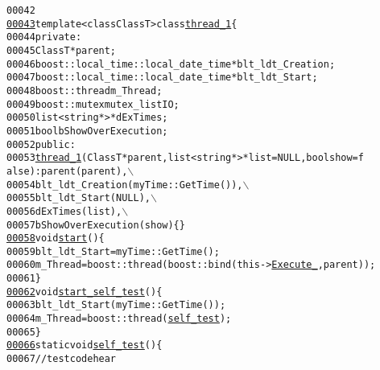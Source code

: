 \begin{footnotesize}
\begin{alltt}
00042 
\hypertarget{myThreadTemplates_8hpp_source_l00043}{}\hyperlink{classmyThreadTemplates_1_1thread__1}{00043} \textcolor{keyword}{template} <\textcolor{keyword}{class} ClassT> \textcolor{keyword}{class }\hyperlink{classmyThreadTemplates_1_1thread__1}{thread_1}\{
00044         \textcolor{keyword}{private}:
00045                 ClassT *parent; 
00046                 boost::local\_time::local\_date\_time *blt\_ldt\_Creation; 
00047                 boost::local\_time::local\_date\_time *blt\_ldt\_Start; 
00048                 boost::thread m\_Thread; 
00049                 boost::mutex mutex\_listIO; 
00050                 list<string*> *dExTimes; 
00051                 \textcolor{keywordtype}{bool} bShowOverExecution; 
00052         \textcolor{keyword}{public}:
00053                 \hyperlink{classmyThreadTemplates_1_1thread__1}{thread_1}(ClassT *parent, list<string*> *list = NULL,\textcolor{keywordtype}{bool} show = \textcolor{keyword}{f
      alse}): parent(parent),\(\backslash\)
00054                 blt\_ldt\_Creation(myTime::GetTime()),\(\backslash\)
00055                 blt\_ldt\_Start(NULL),\(\backslash\)
00056                 dExTimes(list),\(\backslash\)
00057                 bShowOverExecution(show)\{\}
\hypertarget{myThreadTemplates_8hpp_source_l00058}{}\hyperlink{classmyThreadTemplates_1_1thread__1_a40dcf528dbb18b16ed44054451a575e1}{00058}                 \textcolor{keywordtype}{void} \hyperlink{classmyThreadTemplates_1_1thread__1_a40dcf528dbb18b16ed44054451a575e1}{start}()\{
00059             blt\_ldt\_Start = myTime::GetTime();
00060             m\_Thread = boost::thread (boost::bind(this->\hyperlink{classmyThreadTemplates_1_1thread__1_a24e615ac4afa0d376faefd500ed47e43}{Execute_},parent));
00061         \}
\hypertarget{myThreadTemplates_8hpp_source_l00062}{}\hyperlink{classmyThreadTemplates_1_1thread__1_aaa171242d5355f2a472a566d30863894}{00062}                 \textcolor{keywordtype}{void} \hyperlink{classmyThreadTemplates_1_1thread__1_aaa171242d5355f2a472a566d30863894}{start_self_test}()\{
00063             blt\_ldt\_Start(myTime::GetTime());
00064             m\_Thread = boost::thread (\hyperlink{classmyThreadTemplates_1_1thread__1_add97f72749590d4023fd23fcd0a3dece}{self_test});
00065         \}
\hypertarget{myThreadTemplates_8hpp_source_l00066}{}\hyperlink{classmyThreadTemplates_1_1thread__1_add97f72749590d4023fd23fcd0a3dece}{00066}                 \textcolor{keyword}{static} \textcolor{keywordtype}{void} \hyperlink{classmyThreadTemplates_1_1thread__1_add97f72749590d4023fd23fcd0a3dece}{self_test}()\{
00067             \textcolor{comment}{//test code hear}

\end{alltt}
\end{footnotesize}
